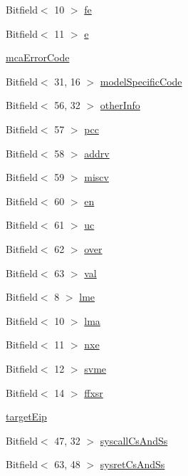 \begin{DoxyCompactItemize}
Bitfield$<$ 10 $>$ \hyperlink{namespaceX86ISA_a003aa902c68ccf1aad688fbf05ab431c}{fe}
\item 
Bitfield$<$ 11 $>$ \hyperlink{namespaceX86ISA_a987882f11918e924dbd860f28b1d495a}{e}
\item 
\hyperlink{namespaceX86ISA_a2ac0e90095845f260937ed640646b3d4}{mcaErrorCode}
\item 
Bitfield$<$ 31, 16 $>$ \hyperlink{namespaceX86ISA_a1da3c4f49e3bc5abd45b8241bb4e90ee}{modelSpecificCode}
\item 
Bitfield$<$ 56, 32 $>$ \hyperlink{namespaceX86ISA_ac966049abcc2165ce4c3e530f4e6d9e6}{otherInfo}
\item 
Bitfield$<$ 57 $>$ \hyperlink{namespaceX86ISA_a80431d592d3cd6c82bd34dec97d4faae}{pcc}
\item 
Bitfield$<$ 58 $>$ \hyperlink{namespaceX86ISA_a7b2c6fc98433fa3572595b224eca42fe}{addrv}
\item 
Bitfield$<$ 59 $>$ \hyperlink{namespaceX86ISA_a7adf7e0e63afd7388be4d5c641d924eb}{miscv}
\item 
Bitfield$<$ 60 $>$ \hyperlink{namespaceX86ISA_a5867d73ee2fc749f07970e5b0403fab4}{en}
\item 
Bitfield$<$ 61 $>$ \hyperlink{namespaceX86ISA_a46a620d14a6b1c3f247ef7718213b1a7}{uc}
\item 
Bitfield$<$ 62 $>$ \hyperlink{namespaceX86ISA_a769c64f716504b92b45ee75c424fbcc5}{over}
\item 
Bitfield$<$ 63 $>$ \hyperlink{namespaceX86ISA_ae13bf1250853ff6b72aabe3c79b587cc}{val}
\item 
Bitfield$<$ 8 $>$ \hyperlink{namespaceX86ISA_a6ef82b08caedf3e5c14f68869dc31c61}{lme}
\item 
Bitfield$<$ 10 $>$ \hyperlink{namespaceX86ISA_aaa6ccb119523112b76790b248709d0b3}{lma}
\item 
Bitfield$<$ 11 $>$ \hyperlink{namespaceX86ISA_a764d126685695aef3fac5ded01176f77}{nxe}
\item 
Bitfield$<$ 12 $>$ \hyperlink{namespaceX86ISA_a4599fdd876f338854ee9fbf714ab8c02}{svme}
\item 
Bitfield$<$ 14 $>$ \hyperlink{namespaceX86ISA_a44fd74341f9a5b091e085b506f580581}{ffxsr}
\item 
\hyperlink{namespaceX86ISA_a2ff74349e82b78eb8b6aa87fa3f3e66d}{targetEip}
\item 
Bitfield$<$ 47, 32 $>$ \hyperlink{namespaceX86ISA_a6842dfa4feeeabe23fee1f79d55af068}{syscallCsAndSs}
\item 
Bitfield$<$ 63, 48 $>$ \hyperlink{namespaceX86ISA_a5ff280db127f4ff2d5ffa17d20a76d4e}{sysretCsAndSs}

\end{DoxyCompactItemize}
